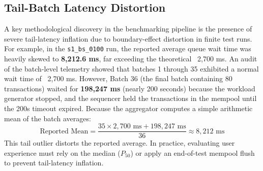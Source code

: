 \subsection{Tail-Batch Latency Distortion}
A key methodological discovery in the benchmarking pipeline is the presence of severe tail-latency inflation due to boundary-effect distortion in finite test runs. For example, in the \texttt{s1\_bs\_0100} run, the reported average queue wait time was heavily skewed to \textbf{8,212.6 ms}, far exceeding the theoretical ~2,700 ms. 
An audit of the batch-level telemetry showed that batches 1 through 35 exhibited a normal wait time of ~2,700 ms. However, Batch 36 (the final batch containing 80 transactions) waited for \textbf{198,247 ms} (nearly 200 seconds) because the workload generator stopped, and the sequencer held the transactions in the mempool until the 200s timeout expired. Because the aggregator computes a simple arithmetic mean of the batch averages:
\begin{equation}
\text{Reported Mean} = \frac{35 \times 2,700\text{ ms} + 198,247\text{ ms}}{36} \approx 8,212\text{ ms}
\end{equation}
This tail outlier distorts the reported average. In practice, evaluating user experience must rely on the median ($P_{50}$) or apply an end-of-test mempool flush to prevent tail-latency inflation.
